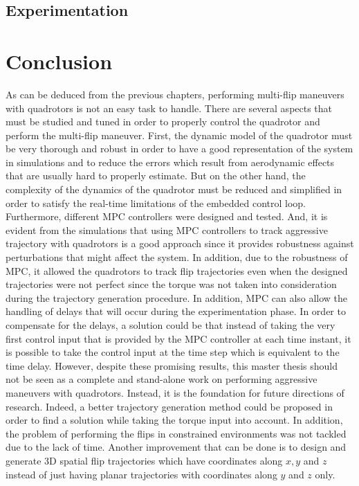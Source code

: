 \documentclass{thesisreport}
\begin{document}
\newpage 
 
 	\section{Experimentation}

\newpage 
 
 \chapter*{Conclusion}
 
 As can be deduced from the previous chapters, performing multi-flip maneuvers with quadrotors is not an easy task to handle. There are several aspects that must be studied and tuned in order to properly control the quadrotor and perform the multi-flip maneuver. First, the dynamic model of the quadrotor must be very thorough and robust in order to have a good representation of the system in simulations and to reduce the errors which result from aerodynamic effects that are usually hard to properly estimate. But on the other hand, the complexity of the dynamics of the quadrotor must be reduced and simplified in order to satisfy the real-time limitations of the embedded control loop.
Furthermore, different MPC controllers were designed and tested. And, it is evident from the simulations that using MPC controllers to track aggressive trajectory with quadrotors is a good approach since it provides robustness against perturbations that might affect the system. In addition, due to the robustness of MPC, it allowed the quadrotors to track flip trajectories even when the designed trajectories were not perfect since the torque was not taken into consideration during the trajectory generation procedure. In addition, MPC can also allow the handling of delays that will occur during the experimentation phase. In order to compensate for the delays, a solution could be that instead of taking the very first control input that is provided by the MPC controller at each time instant, it is possible to take the control input at the time step which is equivalent to the time delay.
However, despite these promising results, this master thesis should not be seen as a complete and stand-alone work on performing aggressive maneuvers with quadrotors. Instead, it is the foundation for future directions of research. Indeed, a better trajectory generation method could be proposed in order to find a solution while taking the torque input into account. In addition, the problem of performing the flips in constrained environments was not tackled due to the lack of time. Another improvement that can be done is to design and generate 3D spatial flip trajectories which have coordinates along $x,y$ and $z$ instead of just having planar trajectories with coordinates along $y$ and $z$ only.
 
\end{document}
